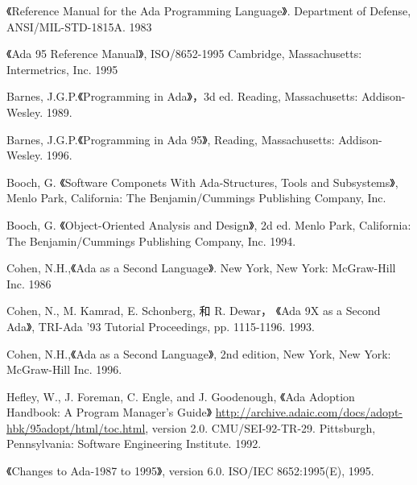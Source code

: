 %
%
%

\cleardoublepage
{}
\begin{thebibliography}{widest-label}\label{bib}

 《Reference Manual for the Ada Programming
Language》. Department of Defense, ANSI/MIL-STD-1815A. 1983

 《Ada 95 Reference Manual》,
ISO/8652-1995 Cambridge, Massachusetts: Intermetrics, Inc. 1995

 Barnes, J.G.P.《Programming in Ada》，3d ed.
Reading, Massachusetts: Addison-Wesley. 1989.

 Barnes, J.G.P.《Programming in Ada 95》,
Reading, Massachusetts: Addison-Wesley. 1996.

 Booch, G. 《Software Componets With Ada-Structures, Tools and Subsystems》,
Menlo Park, California: The Benjamin/Cummings Publishing Company, Inc.

 Booch, G. 《Object-Oriented Analysis and
Design》, 2d ed. Menlo Park, California: The Benjamin/Cummings Publishing
Company, Inc. 1994.

 Cohen, N.H.,《Ada as a Second Language》.
 New York, New York: McGraw-Hill Inc. 1986

 Cohen, N., M. Kamrad, E. Schonberg,
和 R. Dewar，  《Ada 9X as a Second Ada》, TRI-Ada '93 Tutorial Proceedings,
pp. 1115-1196. 1993.

 Cohen, N.H.,《Ada as a Second Language》,
2nd edition, New York, New York: McGraw-Hill Inc. 1996.

 Hefley, W., J. Foreman, C. Engle, and
J. Goodenough, 《Ada Adoption Handbook: A Program Manager's Guide》
\url{http://archive.adaic.com/docs/adopt-hbk/95adopt/html/toc.html},
version 2.0. CMU/SEI-92-TR-29. Pittsburgh, Pennsylvania:
Software Engineering Institute. 1992.

 《Changes to Ada-1987 to 1995》,
version 6.0. ISO/IEC 8652:1995(E), 1995.


\end{thebibliography}
